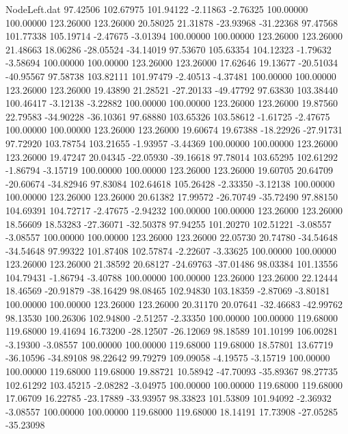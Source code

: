 \begin{filecontents}{NodeLeft.dat}
  97.42506  102.67975  101.94122    -2.11863   -2.76325  100.00000  100.00000  123.26000  123.26000   20.58025   21.31878  -23.93968  -31.22368
  97.47568  101.77338  105.19714    -2.47675   -3.01394  100.00000  100.00000  123.26000  123.26000   21.48663   18.06286  -28.05524  -34.14019
  97.53670  105.63354  104.12323    -1.79632   -3.58694  100.00000  100.00000  123.26000  123.26000   17.62646   19.13677  -20.51034  -40.95567
  97.58738  103.82111  101.97479    -2.40513   -4.37481  100.00000  100.00000  123.26000  123.26000   19.43890   21.28521  -27.20133  -49.47792
  97.63830  103.38440  100.46417    -3.12138   -3.22882  100.00000  100.00000  123.26000  123.26000   19.87560   22.79583  -34.90228  -36.10361
  97.68880  103.65326  103.58612    -1.61725   -2.47675  100.00000  100.00000  123.26000  123.26000   19.60674   19.67388  -18.22926  -27.91731
  97.72920  103.78754  103.21655    -1.93957   -3.44369  100.00000  100.00000  123.26000  123.26000   19.47247   20.04345  -22.05930  -39.16618
  97.78014  103.65295  102.61292    -1.86794   -3.15719  100.00000  100.00000  123.26000  123.26000   19.60705   20.64709  -20.60674  -34.82946
  97.83084  102.64618  105.26428    -2.33350   -3.12138  100.00000  100.00000  123.26000  123.26000   20.61382   17.99572  -26.70749  -35.72490
  97.88150  104.69391  104.72717    -2.47675   -2.94232  100.00000  100.00000  123.26000  123.26000   18.56609   18.53283  -27.36071  -32.50378
  97.94255  101.20270  102.51221    -3.08557   -3.08557  100.00000  100.00000  123.26000  123.26000   22.05730   20.74780  -34.54648  -34.54648
  97.99322  101.87408  102.57874    -2.22607   -3.33625  100.00000  100.00000  123.26000  123.26000   21.38592   20.68127  -24.69763  -37.01486
  98.03384  101.13556  104.79431    -1.86794   -3.40788  100.00000  100.00000  123.26000  123.26000   22.12444   18.46569  -20.91879  -38.16429
  98.08465  102.94830  103.18359    -2.87069   -3.80181  100.00000  100.00000  123.26000  123.26000   20.31170   20.07641  -32.46683  -42.99762
  98.13530  100.26306  102.94800    -2.51257   -2.33350  100.00000  100.00000  119.68000  119.68000   19.41694   16.73200  -28.12507  -26.12069
  98.18589  101.10199  106.00281    -3.19300   -3.08557  100.00000  100.00000  119.68000  119.68000   18.57801   13.67719  -36.10596  -34.89108
  98.22642   99.79279  109.09058    -4.19575   -3.15719  100.00000  100.00000  119.68000  119.68000   19.88721   10.58942  -47.70093  -35.89367
  98.27735  102.61292  103.45215    -2.08282   -3.04975  100.00000  100.00000  119.68000  119.68000   17.06709   16.22785  -23.17889  -33.93957
  98.33823  101.53809  101.94092    -2.36932   -3.08557  100.00000  100.00000  119.68000  119.68000   18.14191   17.73908  -27.05285  -35.23098

\end{filecontents}
